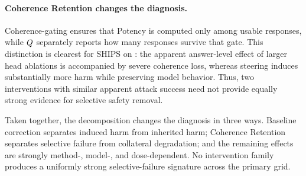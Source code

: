 \paragraph{Coherence Retention changes the diagnosis.}
Coherence-gating ensures that Potency is computed only among usable responses, while $Q$ separately reports how many responses survive that gate. This
distinction is clearest for SHIPS on : the apparent answer-level effect of larger head ablations is accompanied by severe coherence loss, whereas steering induces substantially more harm while preserving model behavior. Thus, two interventions with similar apparent attack success need not provide equally strong evidence for selective safety removal.

Taken together, the decomposition changes the diagnosis in three ways. Baseline correction separates induced harm from inherited harm; Coherence Retention separates selective failure from collateral degradation; and the remaining effects are strongly method-, model-, and dose-dependent. No intervention family produces a uniformly strong selective-failure signature across the primary grid.
